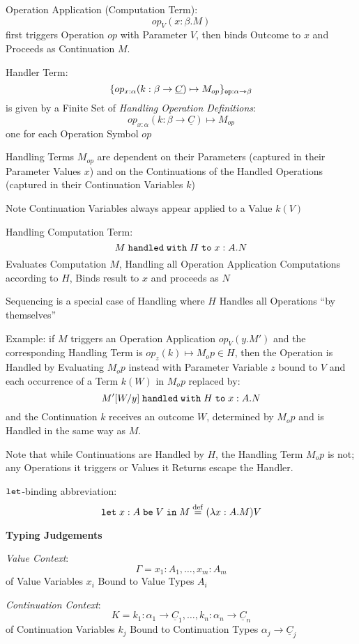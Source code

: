 Operation Application (Computation Term):
\[
  op_V(x:\beta.M)
\]
first triggers Operation $op$ with Parameter $V$, then binds
Outcome to $x$ and Proceeds as Continuation $M$.

Handler Term:
\[
  \{ op_{x:\alpha}
    (k:\beta \rightarrow \underline{C}) \mapsto
    M_{op} \}_{\mathtt{op:\alpha \rightarrowtriangle \beta}}
\]
is given by a Finite Set of \emph{Handling Operation Definitions}:
\[
  op_{x:\alpha}
    (k:\beta \rightarrow \underline{C}) \mapsto
    M_{op}
\]
one for each Operation Symbol $op$

Handling Terms $M_{op}$ are dependent on their Parameters
(captured in their Parameter Values $x$) and on the Continuations of
the Handled Operations (captured in their Continuation Variables $k$)

\fist Note Continuation Variables always appear applied to a Value
$k(V)$

Handling Computation Term:
\[
  M \;\mathtt{handled\;with}\; H \;\mathtt{to}\; x:A.N
\]
Evaluates Computation $M$, Handling all Operation Application
Computations according to $H$, Binds result to $x$ and proceeds as $N$

Sequencing is a special case of Handling where $H$ Handles all
Operations ``by themselves''

Example: if $M$ triggers an Operation Application $op_V(y.M')$
and the corresponding Handling Term is $op_z(k) \mapsto
M_op \in H$, then the Operation is Handled by Evaluating
$M_op$ instead with Parameter Variable $z$ bound to $V$ and
each occurrence of a Term $k(W)$ in $M_op$ replaced by:
\[
  M'[W/y] \;\mathtt{handled\;with}\; H \;\mathtt{to}\; x:A.N
\]
and the Continuation $k$ receives an outcome $W$, determined by
$M_op$ and is Handled in the same way as $M$.

\fist Note that while Continuations are Handled by $H$, the Handling
Term $M_op$ is not; any Operations it triggers or Values it
Returns escape the Handler.

$\mathtt{let}$-binding abbreviation:
\[
  \mathtt{let}\; x:A \;\mathtt{be}\; V \;\mathtt{in}\; M
    \stackrel{\mathrm{def}}= (\lambda x:A.M)V
\]


\textbf{Typing Judgements}

\emph{Value Context}:
\[
  \Gamma = x_1:A_1, \ldots,x_m:A_m
\]
of Value Variables $x_i$ Bound to Value Types $A_i$

\emph{Continuation Context}:
\[
  K = k_1:\alpha_1 \rightarrow \underline{C}_1, \ldots,
    k_n:\alpha_n \rightarrow \underline{C}_n
\]
of Continuation Variables $k_j$ Bound to Continuation Types $\alpha_j
\rightarrow \underline{C}_j$

